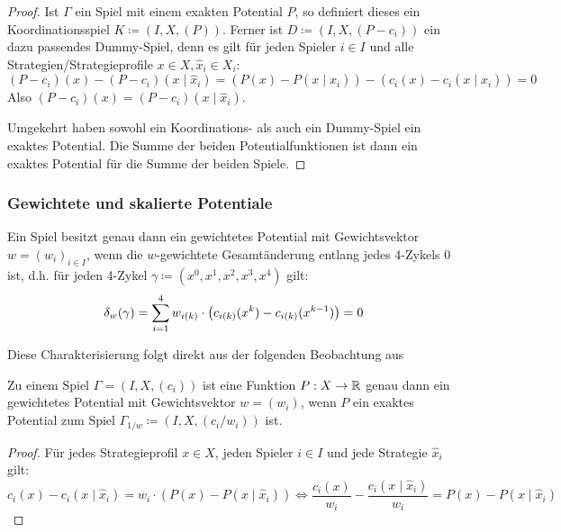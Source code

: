 \begin{proof}
	Ist $\Gamma$ ein Spiel mit einem exakten Potential $P$, so definiert dieses ein Koordinationsspiel $K \coloneqq (I, X, (P))$. Ferner ist $D \coloneqq (I, X, (P-c_i))$ ein dazu passendes Dummy-Spiel, denn es gilt für jeden Spieler $i \in I$ und alle Strategien/Strategieprofile $x \in X, \hat{x}_i \in X_i$:
		\[(P-c_i)(x) - (P-c_i)(x \mid \hat{x}_i) = \left(P(x) - P(x \mid \hat{x}_i)\right) - \left(c_i(x) - c_i(x \mid \hat{x}_i)\right) = 0 \]
	Also $(P-c_i)(x) = (P-c_i)(x \mid \hat{x}_i)$.
	
	Umgekehrt haben sowohl ein Koordinations- als auch ein Dummy-Spiel ein exaktes Potential. Die Summe der beiden Potentialfunktionen ist dann ein exaktes Potential für die Summe der beiden Spiele.
\end{proof}


\subsubsection{Gewichtete und skalierte Potentiale}

\begin{satz}\label{satz:CharGewPot}
	Ein Spiel besitzt genau dann ein gewichtetes Potential mit Gewichtsvektor $w = (w_i)_{i \in I}$, wenn die $w$-gewichtete Gesamtänderung entlang jedes 4-Zykels $0$ ist, d.h. für jeden 4-Zykel $\gamma \coloneqq (x^0, x^1, x^2, x^3, x^4)$ gilt:
	\[\delta_w(\gamma) = \sum_{i=1}^4 w_{i(k)}\cdot\left(c_{i(k)}(x^k) - c_{i(k)}(x^{k-1})\right) = 0\]
\end{satz}

Diese Charakterisierung folgt direkt aus der folgenden Beobachtung aus \cite[Kapitel 3.2]{CharExGewPotinWCG}

\begin{beob}\label{beob:ZshExGewPot}
	Zu einem Spiel $\Gamma = (I, X, (c_i))$ ist eine Funktion $P: X \to \mathbb{R}$ genau dann ein gewichtetes Potential mit Gewichtsvektor $w = (w_i)$, wenn $P$ ein exaktes Potential zum Spiel $\Gamma_{1/w} \coloneqq (I, X, (c_i/w_i))$ ist.
\end{beob}

\begin{proof}
	Für jedes Strategieprofil $x \in X$, jeden Spieler $i \in I$ und jede Strategie $\hat{x}_i$ gilt:
		\[c_i(x) - c_i(x \mid \hat{x}_i) = w_i\cdot(P(x) - P(x \mid \hat{x}_i)) \iff \frac{c_i(x)}{w_i} - \frac{c_i(x \mid \hat{x}_i)}{w_i} = P(x) - P(x \mid \hat{x}_i) \]
\end{proof}


